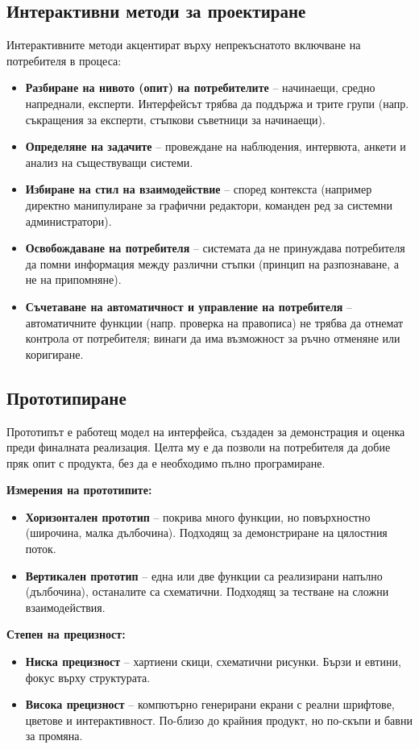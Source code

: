 \documentclass{scrartcl}
\begin{document}
\begin{FlushLeft}
\subsection{Интерактивни методи за проектиране}

Интерактивните методи акцентират върху непрекъснатото включване на потребителя в процеса:
\begin{itemize}
    \item \textbf{Разбиране на нивото (опит) на потребителите} – начинаещи, средно напреднали, експерти. Интерфейсът трябва да поддържа и трите групи (напр. съкращения за експерти, стъпкови съветници за начинаещи).
    \item \textbf{Определяне на задачите} – провеждане на наблюдения, интервюта, анкети и анализ на съществуващи системи.
    \item \textbf{Избиране на стил на взаимодействие} – според контекста (например директно манипулиране за графични редактори, команден ред за системни администратори).
    \item \textbf{Освобождаване на потребителя} – системата да не принуждава потребителя да помни информация между различни стъпки (принцип на разпознаване, а не на припомняне).
    \item \textbf{Съчетаване на автоматичност и управление на потребителя} – автоматичните функции (напр. проверка на правописа) не трябва да отнемат контрола от потребителя; винаги да има възможност за ръчно отменяне или коригиране.
\end{itemize}

\subsection{Прототипиране}

Прототипът е работещ модел на интерфейса, създаден за демонстрация и оценка преди финалната реализация. Целта му е да позволи на потребителя да добие пряк опит с продукта, без да е необходимо пълно програмиране.

\textbf{Измерения на прототипите:}
\begin{itemize}
    \item \textbf{Хоризонтален прототип} – покрива много функции, но повърхностно (широчина, малка дълбочина). Подходящ за демонстриране на цялостния поток.
    \item \textbf{Вертикален прототип} – една или две функции са реализирани напълно (дълбочина), останалите са схематични. Подходящ за тестване на сложни взаимодействия.
\end{itemize}
\textbf{Степен на прецизност:}
\begin{itemize}
    \item \textbf{Ниска прецизност} – хартиени скици, схематични рисунки. Бързи и евтини, фокус върху структурата.
    \item \textbf{Висока прецизност} – компютърно генерирани екрани с реални шрифтове, цветове и интерактивност. По-близо до крайния продукт, но по-скъпи и бавни за промяна.
\end{itemize}


\end{FlushLeft}
\end{document}
